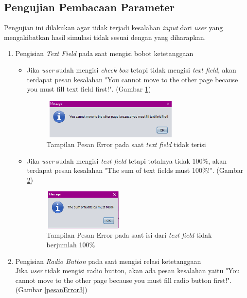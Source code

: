 \subsection{Pengujian Pembacaan Parameter}
Pengujian ini dilakukan agar tidak terjadi kesalahan \textit{input} dari \textit{user} yang mengakibatkan hasil simulasi tidak sesuai dengan yang diharapkan.
\begin{enumerate}
	\item Pengisian \textit{Text Field} pada saat mengisi bobot ketetanggaan
	\begin{itemize}
		\item Jika \textit{user} sudah mengisi \textit{check box} tetapi tidak mengisi \textit{text field}, akan terdapat pesan kesalahan "You cannot move to the other page because you must fill text field first!". (Gambar \ref{pesanError1})
		
	\begin{figure} [H]
	\centering  
	\includegraphics[width=7cm, height=2cm]{pesanError2} 
		\caption[Tampilan Pesan Error pada saat \textit{text field} tidak terisi]{Tampilan Pesan Error pada saat \textit{text field} tidak terisi}
	\label{pesanError1} 
\end{figure}
		
		\item Jika \textit{user} sudah mengisi \textit{text field} tetapi totalnya tidak 100\%, akan terdapat pesan kesalahan "The sum of text fields must 100\%!". (Gambar \ref{pesanError2})
		
	\begin{figure} [H]
	\centering  
	\includegraphics[width=4cm, height=2cm]{pesanError1} 
		\caption[Tampilan Pesan Error pada saat isi dari \textit{text field} tidak berjumlah 100\%]{Tampilan Pesan Error pada saat isi dari \textit{text field} tidak berjumlah 100\%}
	\label{pesanError2} 
\end{figure}

	\end{itemize}
	
	\item Pengisian \textit{Radio Button} pada saat mengisi relasi ketetanggaan\\
	Jika \textit{user} tidak mengisi radio button, akan ada pesan kesalahan yaitu "You cannot move to the other page because you must fill radio button first!". (Gambar \ref{pesanError3})
	

\end{enumerate}
